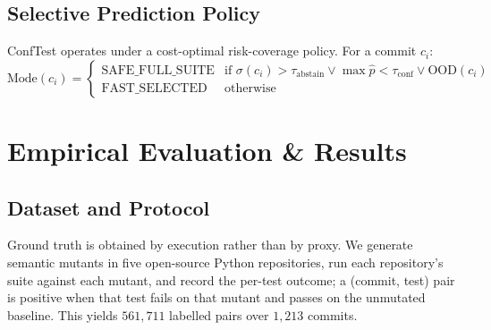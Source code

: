 \documentclass[sigconf,screen]{acmart}
\begin{document}
\subsection{Selective Prediction Policy}
ConfTest operates under a cost-optimal risk-coverage policy. For a commit $c_i$:
\begin{equation}
    \text{Mode}(c_i) = \begin{cases}
        \text{SAFE\_FULL\_SUITE} & \text{if } \sigma(c_i) > \tau_{\text{abstain}} \lor \max \hat{p} < \tau_{\text{conf}} \lor \text{OOD}(c_i) \\
        \text{FAST\_SELECTED} & \text{otherwise}
    \end{cases}
\end{equation}

\section{Empirical Evaluation \& Results}

\subsection{Dataset and Protocol}
Ground truth is obtained by execution rather than by proxy. We generate semantic mutants in five
open-source Python repositories, run each repository's suite against each mutant, and record the
per-test outcome; a (commit, test) pair is positive when that test fails on that mutant and passes
on the unmutated baseline. This yields $561{,}711$ labelled pairs over $1{,}213$ commits.
\end{document}
